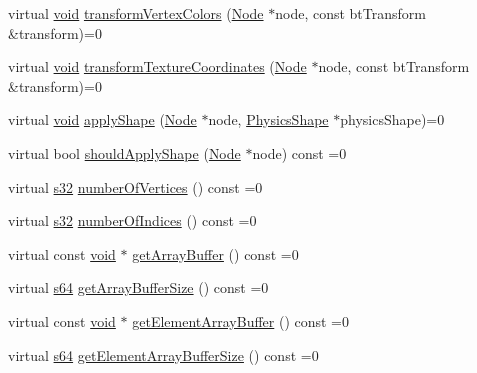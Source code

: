 \begin{DoxyCompactItemize}
virtual \mbox{\hyperlink{_thread_8h_af1e856da2e658414cb2456cb6f7ebc66}{void}} \mbox{\hyperlink{classnjli_1_1_geometry_a1169257a4241392cec0a23c922f148f3}{transform\+Vertex\+Colors}} (\mbox{\hyperlink{classnjli_1_1_node}{Node}} $\ast$node, const bt\+Transform \&transform)=0
\item 
virtual \mbox{\hyperlink{_thread_8h_af1e856da2e658414cb2456cb6f7ebc66}{void}} \mbox{\hyperlink{classnjli_1_1_geometry_a8ffb29f40c6f175f83cc36568feb87c4}{transform\+Texture\+Coordinates}} (\mbox{\hyperlink{classnjli_1_1_node}{Node}} $\ast$node, const bt\+Transform \&transform)=0
\item 
virtual \mbox{\hyperlink{_thread_8h_af1e856da2e658414cb2456cb6f7ebc66}{void}} \mbox{\hyperlink{classnjli_1_1_geometry_a6661dda8bb03d0f3d6e9764760b6b13f}{apply\+Shape}} (\mbox{\hyperlink{classnjli_1_1_node}{Node}} $\ast$node, \mbox{\hyperlink{classnjli_1_1_physics_shape}{Physics\+Shape}} $\ast$physics\+Shape)=0
\item 
virtual bool \mbox{\hyperlink{classnjli_1_1_geometry_a9d2e2064f925d9be17ed7fb1b84b728a}{should\+Apply\+Shape}} (\mbox{\hyperlink{classnjli_1_1_node}{Node}} $\ast$node) const =0
\item 
virtual \mbox{\hyperlink{_util_8h_aa62c75d314a0d1f37f79c4b73b2292e2}{s32}} \mbox{\hyperlink{classnjli_1_1_geometry_a27b42b7a7ed3c67a6f8827288828687a}{number\+Of\+Vertices}} () const =0
\item 
virtual \mbox{\hyperlink{_util_8h_aa62c75d314a0d1f37f79c4b73b2292e2}{s32}} \mbox{\hyperlink{classnjli_1_1_geometry_a1033c9f6dee9f725b122c2ddd33f4b0e}{number\+Of\+Indices}} () const =0
\item 
virtual const \mbox{\hyperlink{_thread_8h_af1e856da2e658414cb2456cb6f7ebc66}{void}} $\ast$ \mbox{\hyperlink{classnjli_1_1_geometry_adbf0ae6c38f23779df2b37708e80c24c}{get\+Array\+Buffer}} () const =0
\item 
virtual \mbox{\hyperlink{_util_8h_a4258bfb2c3a440d06c4aaa3c2b450dde}{s64}} \mbox{\hyperlink{classnjli_1_1_geometry_a97ec03852997043d6900af8009b390d9}{get\+Array\+Buffer\+Size}} () const =0
\item 
virtual const \mbox{\hyperlink{_thread_8h_af1e856da2e658414cb2456cb6f7ebc66}{void}} $\ast$ \mbox{\hyperlink{classnjli_1_1_geometry_ac4edd389ae104da289e2282d780454f0}{get\+Element\+Array\+Buffer}} () const =0
\item 
virtual \mbox{\hyperlink{_util_8h_a4258bfb2c3a440d06c4aaa3c2b450dde}{s64}} \mbox{\hyperlink{classnjli_1_1_geometry_ac857e830af897450652aee0922e62e20}{get\+Element\+Array\+Buffer\+Size}} () const =0

\end{DoxyCompactItemize}
